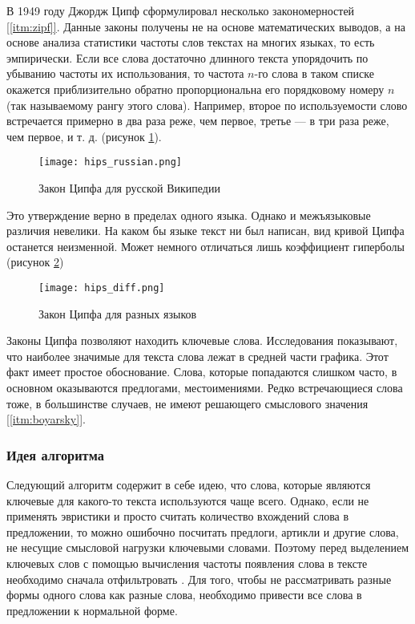 В 1949 году Джордж Ципф сформулировал несколько закономерностей \hyperref[itm:zipf]{[\ref{itm:zipf}]}. Данные законы получены не на основе математических выводов, а на
основе анализа статистики частоты слов текстах на многих языках, то есть эмпирически.
Если все слова достаточно длинного текста упорядочить по убыванию
частоты их использования, то частота $n$-го слова в таком списке окажется
приблизительно обратно пропорциональна его порядковому номеру $n$ (так
называемому рангу этого слова). Например, второе по используемости
слово встречается примерно в два раза реже, чем первое, третье — в три
раза реже, чем первое, и т. д. (рисунок \hyperref[fig:hips_rus]{\ref{fig:hips_rus}}).
\begin{figure}[H]
\centering
\texttt{[image: hips\_russian.png]}
\caption{Закон Ципфа для русской Википедии}
\label{fig:hips_rus}
\end{figure}
Это утверждение верно в пределах одного языка. Однако и межъязыковые различия невелики. На каком бы языке текст ни был написан, вид
кривой Ципфа останется неизменной. Может немного отличаться лишь коэффициент гиперболы (рисунок \hyperref[fig:hips_diff]{\ref{fig:hips_diff}})
\begin{figure}[H]
\centering
\texttt{[image: hips\_diff.png]}
\caption{Закон Ципфа для разных языков}
\label{fig:hips_diff}
\end{figure}
Законы Ципфа позволяют находить ключевые слова.
Исследования показывают, что наиболее значимые для текста слова
лежат в средней части графика. Этот факт имеет простое обоснование. Слова, которые попадаются слишком часто, в основном оказываются предлогами, местоимениями. Редко встречающиеся слова тоже, в большинстве случаев, не имеют решающего смыслового значения \hyperref[itm:boyarsky]{[\ref{itm:boyarsky}]}.

\subsubsection{Идея алгоритма}

Следующий алгоритм содержит в себе идею, что слова, которые являются ключевые для какого-то текста используются чаще всего. Однако, если не применять эвристики и просто считать количество вхождений слова в предложении, то можно ошибочно посчитать предлоги, артикли и другие слова, не несущие смысловой нагрузки ключевыми словами. Поэтому перед выделением ключевых слов с помощью вычисления частоты появления слова в тексте необходимо сначала отфильтровать . Для того, чтобы не рассматривать разные формы одного слова как разные слова, необходимо привести все слова в предложении к нормальной форме.

